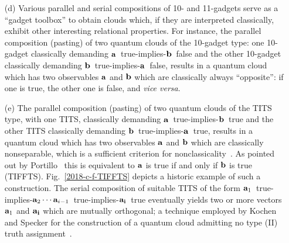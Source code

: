 \documentclass[%
  reprint,
  twocolumn,
 showpacs,
 showkeys,
 preprintnumbers,
 amsmath,amssymb,
 aps,
  prl,
  longbibliography,
 ]{revtex4-1}
\begin{document}
\begin{enumerate}
\item[(d)]
Various parallel and serial compositions of 10- and 11-gadgets serve as a ``gadget toolbox'' to obtain clouds which,  if they are interpreted classically,
exhibit other interesting relational properties.
For instance, the parallel composition (pasting) of two quantum clouds of the 10-gadget type:
one 10-gadget classically demanding ${\bf a}$~true-implies-${\bf b}$~false
and the other 10-gadget  classically demanding ${\bf b}$~true-implies-${\bf a}$~false, results in a  quantum cloud which  has two observables ${\bf a}$ and ${\bf b}$
which are classically always ``opposite'': if one is true, the other one is false, and {\it vice versa}.

\item[(e)]
The parallel composition (pasting) of two quantum clouds of the TITS type, with one TITS, classically demanding ${\bf a}$~true-implies-${\bf b}$~true
and the other TITS  classically demanding ${\bf b}$~true-implies-${\bf a}$~true, results in a  quantum cloud which  has two observables ${\bf a}$ and ${\bf b}$
which are classically nonseparable, which is a sufficient criterion for nonclassicality~\cite[Theorem~0, p.~67]{kochen1}.
As pointed out by Portillo~\cite{Portillo-2018-pc} this is equivalent to ${\bf a}$ is true if and only if ${\bf b}$ is true (TIFFTS).
Fig.~\ref{2018-c-f-TIFFTS} depicts a historic example of such a construction.
The serial composition of suitable TITS
of the form ${\bf a}_1$~true-implies-${\bf a}_2 \cdots {\bf a}_{i-1}$~true-implies-${\bf a_i}$~true
eventually yields two or more vectors ${\bf a}_1$ and ${\bf a_i}$ which are mutually orthogonal; a technique employed by Kochen and Specker
for the construction of a quantum cloud admitting no type (II) truth assignment~\cite[$\Gamma_2$, p.~69]{kochen1}.

\begin{figure}
\begin{center}
\end{center}
\end{figure}
\end{enumerate}
\end{document}

